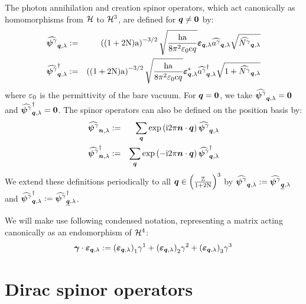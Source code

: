 \documentclass[10pt,a4paper,twoside,openany]{book}
\begin{document}
The photon annihilation and creation spinor operators, which act canonically as homomorphisms from $\H$ to $\H^3$, are defined for $\q \neq \sv 0$ by:
\begin{eqnarray*}
\tSAop \photon \q \sp & \eqdef & \left( ( 1 + 2 \N ) \a \right)^{-3/2} \sqrt{ \frac {\h \a} {8 \pi^2 \vpty \c q} } \photonspin \q \sp \aop \photon \q \sp \sqrt{\Nop \photon \q \sp} \\
\tSCop \photon \q \sp & \eqdef & \left( ( 1 + 2 \N ) \a \right)^{-3/2} \sqrt{ \frac {\h \a} {8 \pi^2 \vpty \c q} } \cphotonspin \q \sp \cop \photon \q \sp \sqrt{1 + \Nop \photon \q \sp}
\end{eqnarray*}
where $\vpty$ is the permittivity of the bare vacuum. For $\q = \sv 0$, we take $\tSAop \photon \q \sp = \sv 0$ and $\tSCop \photon \q \sp = \sv 0$. The spinor operators can also be defined on the position basis by:
\begin{eqnarray*}
\tSAop \photon \n \sp & \eqdef & \sum_{\q} \exp{\i 2 \pi \n \ssp \q} \tSAop \photon \q \sp \\
\tSCop \photon \n \sp & \eqdef & \sum_{\q} \exp{-\i 2 \pi \n \ssp \q} \tSCop \photon \q \sp
\end{eqnarray*}
We extend these definitions periodically to all $\q \in \ILD$ by $\tSAop \photon \q \sp \eqdef \tSAop \photon {\eqp \q} \sp$ and $\tSCop \photon \q \sp \eqdef \tSCop \photon {\eqp \q} \sp$.

We will make use following condensed notation, representing a matrix acting canonically as an endomorphism of $\H^4$:
\begin{equation*}
\gamvec \ssp \photonspin \q \sp \eqdef \svc {(\photonspin \q \sp)} 1 \gammat 1 + \svc {(\photonspin \q \sp)} 2 \gammat 2 + \svc {(\photonspin \q \sp)} 3 \gammat 3
\end{equation*}

\section{Dirac spinor operators}
\label{Dirac spinors}
\end{document}
